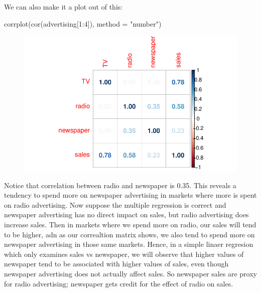 \documentclass[
  letterpaper,
  DIV=11,
  numbers=noendperiod]{scrreprt}
\newenvironment{Shaded}{\begin{snugshade}}{\end{snugshade}}
\newcommand{\AttributeTok}[1]{\textcolor[rgb]{0.40,0.45,0.13}{#1}}
\newcommand{\DecValTok}[1]{\textcolor[rgb]{0.68,0.00,0.00}{#1}}
\newcommand{\FunctionTok}[1]{\textcolor[rgb]{0.28,0.35,0.67}{#1}}
\newcommand{\NormalTok}[1]{\textcolor[rgb]{0.00,0.23,0.31}{#1}}
\newcommand{\SpecialCharTok}[1]{\textcolor[rgb]{0.37,0.37,0.37}{#1}}
\newcommand{\StringTok}[1]{\textcolor[rgb]{0.13,0.47,0.30}{#1}}
\begin{document}
We can also make it a plot out of this:

\begin{Shaded}
\begin{Highlighting}[]
\FunctionTok{corrplot}\NormalTok{(}\FunctionTok{cor}\NormalTok{(advertising[}\DecValTok{1}\SpecialCharTok{:}\DecValTok{4}\NormalTok{]), }\AttributeTok{method =} \StringTok{"number"}\NormalTok{)}
\end{Highlighting}
\end{Shaded}

\begin{figure}[H]

{\centering \includegraphics{Chapter3_files/figure-pdf/unnamed-chunk-57-1.pdf}

}

\end{figure}

Notice that correlation between radio and newspaper is 0.35. This
reveals a tendency to spend more on newspaper advertising in markets
where more is spent on radio advertising. Now suppose the multiple
regression is correct and newspaper advertising has no direct impact on
sales, but radio advertising does increase sales. Then in markets where
we spend more on radio, our sales will tend to be higher, adn as our
correaltion matrix shows, we also tend to spend more on newspaper
advertising in those same markets. Hence, in a simple linaer regresion
which only examines sales vs newspaper, we will observe that higher
values of newspaper tend to be associated with higher values of sales,
even though newspaper advertising does not actually affect sales. So
newspaper sales are proxy for radio advertising; newspaper gets credit
for the effect of radio on sales.
\end{document}
